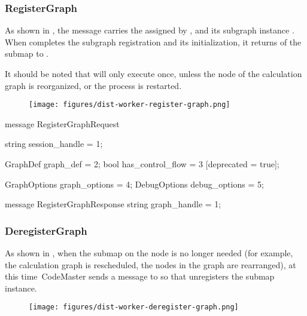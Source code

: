 \begin{content}
\subsubsection{RegisterGraph}

As shown in , the  message carries the  assigned by , and its subgraph instance  . When  completes the subgraph registration and its initialization, it returns  of the submap to .

It should be noted that  will only execute  once, unless the node of the calculation graph is reorganized, or the  process is restarted.

\begin{figure}[H]
\centering
\texttt{[image: figures/dist-worker-register-graph.png]}
\caption{}
 \label{fig:dist-worker-register-graph}
\end{figure}

\begin{leftbar}
\begin{c++}
message RegisterGraphRequest {
  string session_handle = 1;

  GraphDef graph_def = 2;
  bool has_control_flow = 3 [deprecated = true];

  GraphOptions graph_options = 4;
  DebugOptions debug_options = 5;
}

message RegisterGraphResponse {
  string graph_handle = 1;
}
\end{c++}
\end{leftbar}


\subsubsection{DeregisterGraph}

As shown in , when the submap on the  node is no longer needed (for example, the calculation graph is rescheduled, the nodes in the graph are rearranged), at this time\ Code{Master} sends a  message to  so that  unregisters the submap instance.

\begin{figure}[H]
\centering
\texttt{[image: figures/dist-worker-deregister-graph.png]}
\caption{}
 \label{fig:dist-worker-deregister-graph}
\end{figure}


\end{content}
